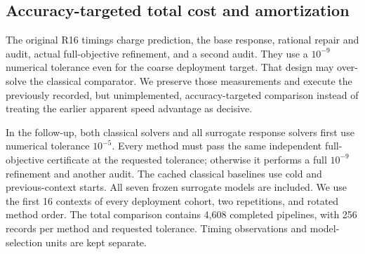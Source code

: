 \documentclass[11pt,letterpaper]{article}
\theoremstyle{definition}
\newcommand{\1}{\mathbf 1}
\begin{document}
\subsection{Accuracy-targeted total cost and amortization}
The original R16 timings charge prediction, the base response, rational repair and audit, actual full-objective refinement, and a second audit. They use a $10^{-9}$ numerical tolerance even for the coarse deployment target. That design may over-solve the classical comparator. We preserve those measurements and execute the previously recorded, but unimplemented, accuracy-targeted comparison instead of treating the earlier apparent speed advantage as decisive.

In the follow-up, both classical solvers and all surrogate response solvers first use numerical tolerance $10^{-5}$. Every method must pass the same independent full-objective certificate at the requested tolerance; otherwise it performs a full $10^{-9}$ refinement and another audit. The cached classical baselines use cold and previous-context starts. All seven frozen surrogate models are included. We use the first 16 contexts of every deployment cohort, two repetitions, and rotated method order. The total comparison contains 4,608 completed pipelines, with 256 records per method and requested tolerance. Timing observations and model-selection units are kept separate.
\end{document}
